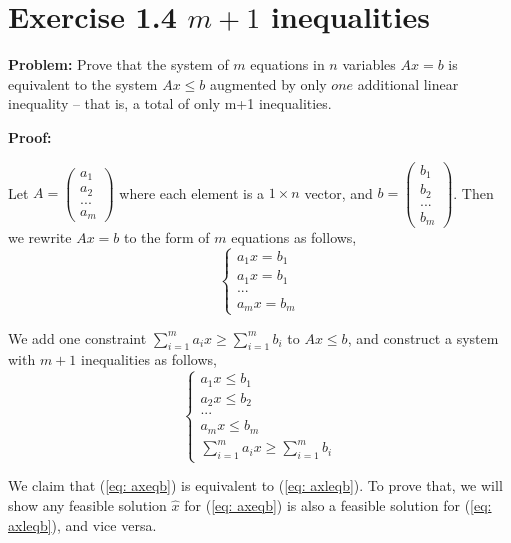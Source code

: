 \section{Exercise 1.4 $m+1$ inequalities}
\textbf{Problem:} Prove that the system of $m$ equations in $n$ variables $Ax=b$ is equivalent to the system $Ax\leq b$ augmented by only $one$ additional linear inequality -- that is, a total of only m+1 inequalities.

\textbf{Proof:}

Let $A=\left( \begin{array}{c} a_{1} \\ a_{2} \\ ... \\ a_{m} \end{array}\right) $ where each element is a $1\times n$ vector, and $b=\left( \begin{array}{c} b_{1} \\ b_{2} \\ ... \\ b_{m}  \end{array} \right) $. Then we rewrite $Ax=b$ to the form of $m$ equations as follows,
\begin{equation}
\label{eq: axeqb}
 \left\{ \begin{array}{c}
a_{1}x=b_{1} \\
a_{1}x=b_{1} \\
...\\
a_{m}x=b_{m}
\end{array} \right.
\end{equation}

We add one constraint $\sum\limits_{i=1}^m a_{i}x \geq \sum\limits_{i=1}^m b_{i}$ to $Ax\leq b$, and construct a system with $m+1$ inequalities as follows,
\begin{equation}
\label{eq: axleqb}
 \left\{ \begin{array}{c}
a_{1}x\leq b_{1} \\
a_{2}x\leq b_{2} \\
...\\
a_{m}x \leq b_{m}\\
\sum\limits_{i=1}^m a_{i}x \geq \sum\limits_{i=1}^m b_{i}
\end{array} \right.
\end{equation}
 
We claim that (\ref{eq: axeqb}) is equivalent to (\ref{eq: axleqb}). To prove that, we will show any feasible solution $\widehat{x}$ for (\ref{eq: axeqb}) is also a feasible solution for (\ref{eq: axleqb}), and vice versa.

